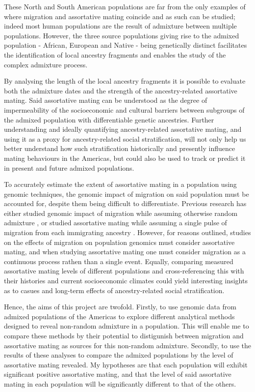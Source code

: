 \documentclass[11pt]{article}
\begin{document}
These North and South American populations are far from the only examples of where migration and assortative mating coincide and as such can be studied; indeed most human populations are the result of admixture between multiple populations. However, the three source populations giving rise to the admixed population - African, European and Native - being genetically distinct facilitates the identification of local ancestry fragments and enables the study of the complex admixture process.

By analysing the length of the local ancestry fragments it is possible to evaluate both the admixture dates and the strength of the ancestry-related assortative mating. Said assortative mating can be understood as the degree of impermeability of the socioeconomic and cultural barriers between subgroups of the admixed population with differentiable genetic ancestries. Further understanding and ideally quantifying ancestry-related assortative mating, and using it as a proxy for ancestry-related social stratification, will not only help us better understand how such stratification historically and presently influence mating behaviours in the Americas, but could also be used to track or predict it in present and future admixed populations. 

To accurately estimate the extent of assortative mating in a population using genomic techniques, the genomic impact of migration on said population must be accounted for, despite them being difficult to differentiate. Previous research has either studied genomic impact of migration while assuming otherwise random admixture \parencite{Norris2020,Borda2020,Gravel2012}, or studied assortative mating while assuming a single pulse of migration from each immigrating ancestry \parencite{Norris2019,Risch2009,Zaitlen2017}. However, for reasons outlined, studies on the effects of migration on population genomics must consider assortative mating, and when studying assortative mating one must consider migration as a continuous process rathen than a single event. Equally, comparing measured assortative mating levels of different populations and cross-referencing this with their histories and current socioeconomic climates could yield interesting insights as to casues and long-term effects of ancestry-related social stratification. 

Hence, the aims of this project are twofold. Firstly, to use genomic data from admixed populations of the Americas to explore different analytical methods designed to reveal non-random admixture in a population. This will enable me to compare these methods by their potential to distigunish between migration and assortative mating as sources for this non-random admixture. Secondly, to use the results of these analyses to compare the admixed populations by the level of assortative mating revealed. My hypotheses are that each population will exhibit significant positive assortative mating, and that the level of said assortative mating in each population will be significantly different to that of the others.
\end{document}
